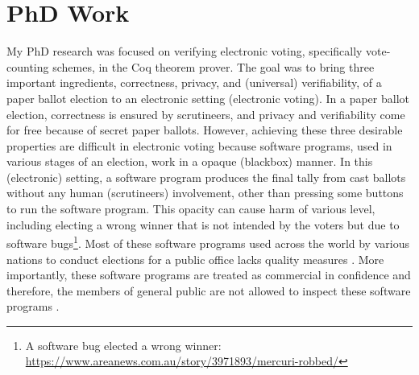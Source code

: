 \documentclass[a4paper]{article}
\begin{document}
\section{PhD Work}
My PhD research was focused on verifying electronic voting, specifically vote-counting schemes, in 
the Coq theorem prover. The goal was to 
bring  three important ingredients, correctness, privacy, and (universal) verifiability, of a paper ballot election to 
an electronic setting (electronic voting). In a paper ballot election, correctness is
ensured by scrutineers, and privacy and verifiability  
come for free because of secret paper ballots.  However, achieving these three desirable properties 
are difficult in 
electronic voting because software programs, used in 
various stages of an election, work in a opaque (blackbox) manner. In this (electronic) setting, 
a software program produces the final tally from cast ballots without any human (scrutineers) involvement, 
other than pressing some 
buttons to run the software program. This opacity can cause harm of various level, including electing a 
wrong winner that is not intended by the voters but due to 
software bugs\footnote{A software bug elected a wrong winner: \url{https://www.areanews.com.au/story/3971893/mercuri-robbed/}}. Most of 
these software programs used across the world by various nations to conduct elections for a public office 
lacks quality measures \cite{10.1145/3014812.3014837, 9152765}. More importantly, these software programs are 
treated as commercial in confidence and therefore,
the members of general public are not allowed to inspect these software programs \cite{AEC:2013:LMM}.
\end{document}
